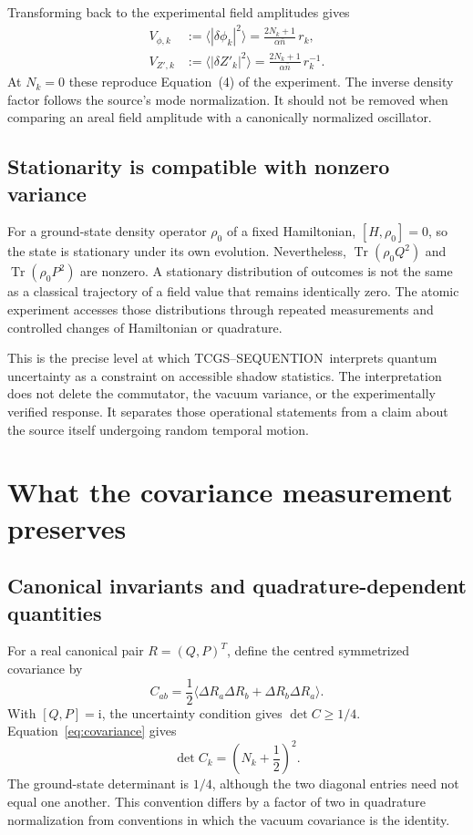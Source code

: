 \documentclass[11pt,a4paper]{article}
\theoremstyle{definition}
\theoremstyle{remark}
\newcommand{\TCGS}{TCGS--SEQUENTION}
\newcommand{\ii}{\mathrm{i}}
\newcommand{\Tr}{\operatorname{Tr}}
\newcommand{\nb}{\bar n}
\begin{document}
Transforming back to the experimental field amplitudes gives
\begin{align}
 V_{\phi,k}&:=\langle|\delta\phi_k|^2\rangle
       =\frac{2N_k+1}{\alpha\nb}\,r_k,\nonumber\\
 V_{Z',k}&:=\langle|\delta Z'_k|^2\rangle
       =\frac{2N_k+1}{\alpha\nb}\,r_k^{-1}.
 \label{eq:field_variances}
\end{align}
At $N_k=0$ these reproduce Equation~(4) of the experiment. The inverse density factor follows the source's mode normalization. It should not be removed when comparing an areal field amplitude with a canonically normalized oscillator.\cite{zhang2026}

\subsection{Stationarity is compatible with nonzero variance}
For a ground-state density operator $\rho_0$ of a fixed Hamiltonian, $[H,\rho_0]=0$, so the state is stationary under its own evolution. Nevertheless, $\Tr(\rho_0Q^2)$ and $\Tr(\rho_0P^2)$ are nonzero. A stationary distribution of outcomes is not the same as a classical trajectory of a field value that remains identically zero. The atomic experiment accesses those distributions through repeated measurements and controlled changes of Hamiltonian or quadrature.\cite{zhang2026,weedbrook}

This is the precise level at which \TCGS\ interprets quantum uncertainty as a constraint on accessible shadow statistics. The interpretation does not delete the commutator, the vacuum variance, or the experimentally verified response. It separates those operational statements from a claim about the source itself undergoing random temporal motion.\cite{foundation,born}

\section{What the covariance measurement preserves}
\label{sec:covariance}
\subsection{Canonical invariants and quadrature-dependent quantities}
For a real canonical pair $R=(Q,P)^T$, define the centred symmetrized covariance by
\begin{equation}
 C_{ab}=\frac12\langle\Delta R_a\Delta R_b+\Delta R_b\Delta R_a\rangle.
 \label{eq:Cdefinition}
\end{equation}
With $[Q,P]=\ii$, the uncertainty condition gives $\det C\geq1/4$. Equation~\eqref{eq:covariance} gives
\begin{equation}
 \det C_k=\left(N_k+\frac12\right)^2.
 \label{eq:detC}
\end{equation}
The ground-state determinant is $1/4$, although the two diagonal entries need not equal one another. This convention differs by a factor of two in quadrature normalization from conventions in which the vacuum covariance is the identity.\cite{weedbrook}
\end{document}
